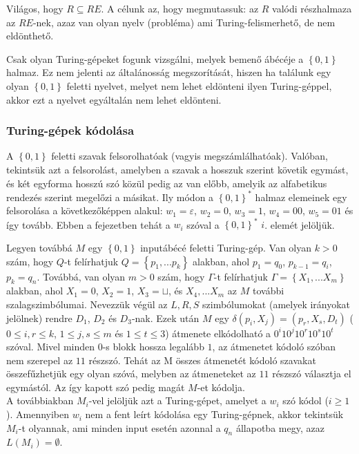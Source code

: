 \documentclass[margin=0px]{article}
\begin{document}
Világos, hogy $R \subseteq RE $. A célunk az, hogy megmutassuk: az $R$ valódi részhalmaza az $RE$-nek,
azaz van olyan nyelv (probléma) ami	Turing-felismerhető, de nem eldönthető.

Csak olyan Turing-gépeket fogunk vizsgálni, melyek bemenő ábécéje a $\left\{0, 1\right\}$ halmaz.
Ez nem jelenti az általánosság megszorítását, hiszen ha	találunk egy olyan $\left\{0, 1\right\}$ feletti nyelvet,
melyet nem lehet eldönteni ilyen Turing-géppel, akkor ezt a nyelvet egyáltalán nem lehet eldönteni.\\

\subsubsection{Turing-gépek kódolása}

A $\left\{0, 1\right\}$ feletti szavak felsorolhatóak (vagyis megszámlálhatóak). Valóban, tekintsük azt a felsorolást,
amelyben a szavak a	hosszuk szerint követik egymást, és két egyforma hosszú szó közül pedig az van
előbb, amelyik az alfabetikus rendezés szerint megelőzi a másikat. Ily módon
a $\left\{0, 1\right\}^{*}$ halmaz elemeinek egy felsorolása a következőképpen alakul: $w_{1} = \varepsilon$,
$w_{2} = 0$, $w_{3} = 1$, $w_{4} = 00$, $w_{5} = 01$ és így tovább. Ebben a fejezetben tehát a
$w_{i}$ szóval a $\left\{0, 1\right\}^{*}$ $i$. elemét jelöljük.

Legyen továbbá $M$ egy $\left\{0, 1\right\}$ inputábécé feletti Turing-gép. Van olyan $k > 0$ szám, hogy
$Q$-t felírhatjuk $Q = \left\{p_{1}, ... p_{k}\right\}$ alakban, ahol $p_{1} = q_{0}$, $p_{k-1} = q_{i}$, $p_{k} = q_{n}$.
Továbbá, van olyan $m > 0$ szám, hogy $\Gamma$-t felírhatjuk $\Gamma = \left\{X_{1}, ... X_{m}\right\}$ alakban,
ahol $X_{1} = 0$, $X_{2} = 1$, $X_{3} = \sqcup$, és $X_{4}, ... X_{m}$ az $M$ további szalagszimbólumai.
Nevezzük végül az $L, R, S$ szimbólumokat (amelyek irányokat jelölnek) rendre $D_{1}$, $D_{2}$ és $D_{3}$-nak.
Ezek után $M$ egy $\delta(p_{i},X_{j}) = (p_{r}, X_{s}, D_{t})$ ($0 \leq i,r \leq k$, $1 \leq j,s \leq m$ és $1 \leq t \leq 3$)
átmenete elkódolható a $0^{i}10^{j}10^{r}10^{s}10^{t}$ szóval. Mivel minden $0$-s blokk hossza legalább $1$, az átmenetet
kódoló szóban nem szerepel az $11$ részszó. Tehát az M összes átmenetét kódoló szavakat összefűzhetjük egy olyan szóvá,
melyben az átmeneteket az $11$ részszó választja el egymástól. Az így kapott szó pedig magát $M$-et kódolja.\\

A továbbiakban $M_{i}$-vel jelöljük azt a Turing-gépet, amelyet a $w_{i}$ szó kódol ($i \geq 1$). Amennyiben
$w_{i}$ nem a fent leírt kódolása egy Turing-gépnek, akkor tekintsük $M_{i}$-t olyannak, ami minden input esetén
azonnal a $q_{n}$ állapotba megy, azaz $L(M_{i}) = \emptyset$.\\
\end{document}

